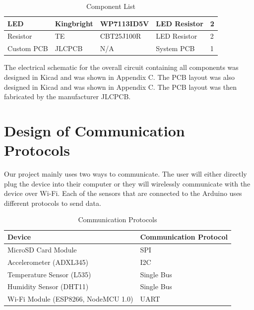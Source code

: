 \documentclass[12pt, titlepage]{article}
\begin{document}
\begin{table}[H]
\begin{tabular}{|p{3cm}|p{2cm}|p{4cm}|p{4cm}|p{2cm}|}
  LED                                
  & Kingbright
  & WP7113ID5V
  & LED Resistor
  & 2
  \newline                            
  \\ \hline

  Resistor                                
  & TE
  & CBT25J100R
  & LED Resistor
  & 2
  \newline                            
  \\ \hline

  Custom PCB                                
  & JLCPCB
  & N/A
  & System PCB
  & 1
  \newline                            
  \\ \hline

  \end{tabular}
  \caption{Component List}
\end{table}

The electrical schematic for the overall circuit containing all components was designed in Kicad and was shown in Appendix C. The PCB layout was also designed in Kicad and was shown in Appendix C. The PCB layout was then fabricated by the manufacturer JLCPCB. \\

\newpage





\newpage
\section{Design of Communication Protocols}
Our project mainly uses two ways to communicate. The user will either directly plug the device into their computer or they will wirelessly communicate with the device over Wi-Fi. Each of the sensors that are connected to the Arduino uses different protocols to send data.


\begin{table}[!h]
\begin{tabular}{| p{} | p{}|}
  \hline
  \rowcolor[gray]{0.9}
  Device & Communication Protocol \\
  \hline
  MicroSD Card Module & SPI\\
  \hline
  Accelerometer (ADXL345) &  I2C\\
  \hline
  Temperature Sensor (L535) & Single Bus \\
  \hline
  Humidity Sensor (DHT11) & Single Bus \\
  \hline
  Wi-Fi Module (ESP8266, NodeMCU 1.0) & UART \\
  \hline
 
\end{tabular}
\caption{Communication Protocols}
\end{table}
\end{document}
